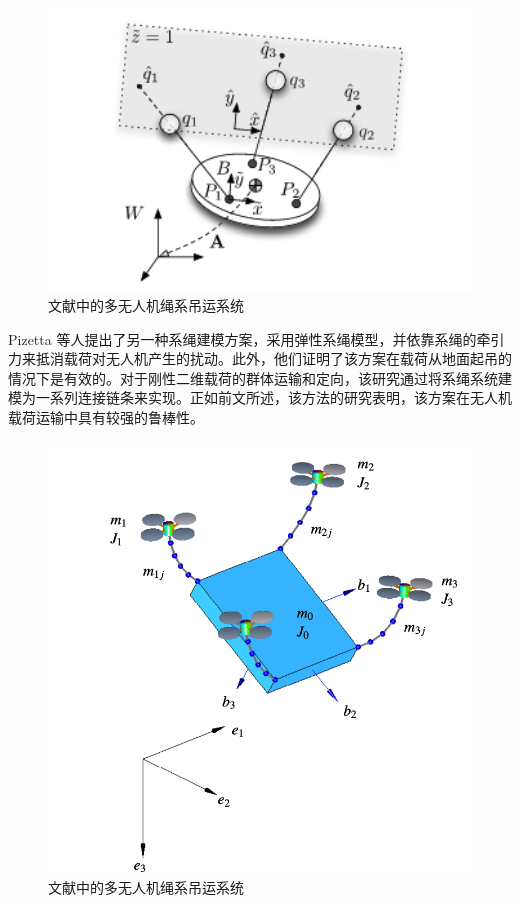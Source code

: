 \documentclass[lang=chs, degree=master, blindreview=false, winfonts=true]{yanputhesis}
\begin{document}
\begin{figure}[hbt!]
	\centering
	\includegraphics[width=28pc]{picture/1_5.png} 
	\caption{文献中的多无人机绳系吊运系统} \label{1_5}
\end{figure}





Pizetta 等人\cite{pizetta2019avoiding}提出了另一种系绳建模方案，采用弹性系绳模型，并依靠系绳的牵引力来抵消载荷对无人机产生的扰动。此外，他们证明了该方案在载荷从地面起吊的情况下是有效的。对于刚性二维载荷的群体运输和定向，该研究通过将系绳系统建模为一系列连接链条来实现\cite{goodarzi2016stabilization}。正如前文\cite{Goodarzi2015}所述，该方法的研究表明，该方案在无人机载荷运输中具有较强的鲁棒性。
\begin{figure}[hbt!]
	\centering
	\includegraphics[width=28pc]{picture/1_6.png} 
	\caption{文献中的多无人机绳系吊运系统} \label{1_6}
\end{figure}
\end{document}
